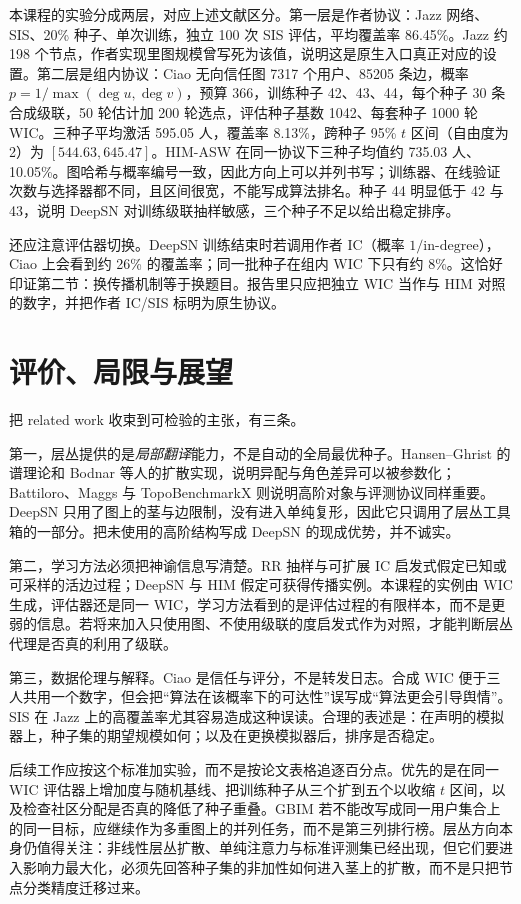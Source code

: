 \documentclass[a4paper,11pt,twocolumn]{ctexart}
\begin{document}
本课程的实验分成两层，对应上述文献区分。第一层是作者协议：Jazz 网络、SIS、20\% 种子、单次训练，独立 100 次 SIS 评估，平均覆盖率 86.45\%。Jazz 约 198 个节点，作者实现里图规模曾写死为该值，说明这是原生入口真正对应的设置。第二层是组内协议：Ciao 无向信任图 7317 个用户、85205 条边，概率 $p=1/\max(\deg u,\deg v)$，预算 366，训练种子 42、43、44，每个种子 30 条合成级联，50 轮估计加 200 轮选点，评估种子基数 1042、每套种子 1000 轮 WIC。三种子平均激活 595.05 人，覆盖率 8.13\%，跨种子 95\% $t$ 区间（自由度为 2）为 $[544.63,645.47]$。HIM-ASW 在同一协议下三种子均值约 735.03 人、10.05\%。图哈希与概率编号一致，因此方向上可以并列书写；训练器、在线验证次数与选择器都不同，且区间很宽，不能写成算法排名。种子 44 明显低于 42 与 43，说明 DeepSN 对训练级联抽样敏感，三个种子不足以给出稳定排序。

还应注意评估器切换。DeepSN 训练结束时若调用作者 IC（概率 $1/\mathrm{in\text{-}degree}$），Ciao 上会看到约 26\% 的覆盖率；同一批种子在组内 WIC 下只有约 8\%。这恰好印证第二节：换传播机制等于换题目。报告里只应把独立 WIC 当作与 HIM 对照的数字，并把作者 IC/SIS 标明为原生协议。

\section{评价、局限与展望}

把 related work 收束到可检验的主张，有三条。

第一，层丛提供的是\emph{局部翻译}能力，不是自动的全局最优种子。Hansen--Ghrist 的谱理论和 Bodnar 等人的扩散实现，说明异配与角色差异可以被参数化；Battiloro、Maggs 与 TopoBenchmarkX 则说明高阶对象与评测协议同样重要。DeepSN 只用了图上的茎与边限制，没有进入单纯复形，因此它只调用了层丛工具箱的一部分。把未使用的高阶结构写成 DeepSN 的现成优势，并不诚实。

第二，学习方法必须把神谕信息写清楚。RR 抽样\cite{borgs}与可扩展 IC 启发式\cite{chen2010}假定已知或可采样的活边过程；DeepSN 与 HIM 假定可获得传播实例。本课程的实例由 WIC 生成，评估器还是同一 WIC，学习方法看到的是评估过程的有限样本，而不是更弱的信息。若将来加入只使用图、不使用级联的度启发式作为对照，才能判断层丛代理是否真的利用了级联。

第三，数据伦理与解释。Ciao 是信任与评分，不是转发日志\cite{etrust}。合成 WIC 便于三人共用一个数字，但会把“算法在该概率下的可达性”误写成“算法更会引导舆情”。SIS 在 Jazz 上的高覆盖率尤其容易造成这种误读。合理的表述是：在声明的模拟器上，种子集的期望规模如何；以及在更换模拟器后，排序是否稳定。

后续工作应按这个标准加实验，而不是按论文表格追逐百分点。优先的是在同一 WIC 评估器上增加度与随机基线、把训练种子从三个扩到五个以收缩 $t$ 区间，以及检查社区分配是否真的降低了种子重叠。GBIM 若不能改写成同一用户集合上的同一目标，应继续作为多重图上的并列任务，而不是第三列排行榜。层丛方向本身仍值得关注：非线性层丛扩散、单纯注意力与标准评测集已经出现\cite{battiloro,maggs,topobench}，但它们要进入影响力最大化，必须先回答种子集的非加性如何进入茎上的扩散，而不是只把节点分类精度迁移过来。
\end{document}
